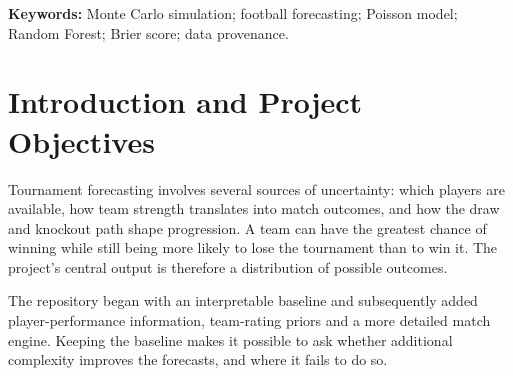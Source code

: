 \begin{abstract}
This study develops and retrospectively evaluates a probabilistic simulation
framework for the FIFA World Cup 2026. The repository combines official squad
records, EAFC-style player ratings, public player statistics and national-team
strength priors to simulate complete tournaments. Three primary approaches are
compared: a Poisson baseline, a heuristic event simulator, and the same event
simulator augmented with a trained Random Forest. A legacy Random Forest run
is retained as a reference. Each saved forecast contains 10,000 tournament
realisations. Predictions are compared with FIFA's published outcomes using
stage-wise Brier scores, champion log loss and top-$k$ qualifier overlap.
Spain, the eventual champion, received title probabilities of 10.26\%, 18.18\%
and 17.11\% in the primary models, although none ranked Spain first. Heuristic
v2 achieved the lowest mean six-stage Brier score, 0.0840, compared with 0.0872
for the baseline and 0.0867 for Random Forest v2. Both v2 approaches ranked
Kylian Mbapp\'{e} first by expected goals. The analysis also identifies substantial
errors in Germany's and Brazil's projected advancement and in the prospects
of Norway and Morocco. Interpretation is limited by heterogeneous player-data
coverage, synthetic model training, and the absence of independently audited
pre-tournament publication timestamps. The results support the value of a
transparent simulation pipeline while motivating historical backtesting,
probability calibration and better source-version tracking.
\end{abstract}
\noindent\textbf{Keywords:} Monte Carlo simulation; football forecasting;
Poisson model; Random Forest; Brier score; data provenance.
\clearpage
\renewcommand{\contentsname}{Contents}
\tableofcontents
\clearpage
\listoffigures
\listoftables
\clearpage

\section{Introduction and Project Objectives}
\label{sec:introduction}
Tournament forecasting involves several sources of uncertainty: which players
are available, how team strength translates into match outcomes, and how the
draw and knockout path shape progression. A team can have the greatest chance
of winning while still being more likely to lose the tournament than to win it.
The project's central output is therefore a distribution of possible outcomes.

The repository began with an interpretable baseline and subsequently added
player-performance information, team-rating priors and a more detailed match
engine. Keeping the baseline makes it possible to ask whether additional
complexity improves the forecasts, and where it fails to do so.
